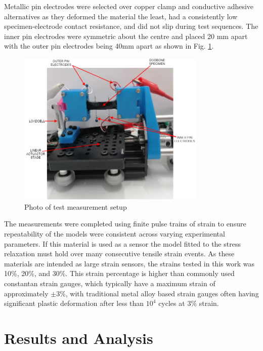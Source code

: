 Metallic pin electrodes were selected over copper clamp and conductive adhesive alternatives as they deformed the material the least, had a consistently low specimen-electrode contact resistance, and did not slip during test sequences. The inner pin electrodes were symmetric about the centre and placed 20 mm apart with the outer pin electrodes being 40mm apart as shown in Fig. \ref{fig:electromech-setup}.
\begin{figure}[H]
	\centering
	\includegraphics[width=9cm]{Figures/ELECTROMECH-SETUP.png}
	\caption{Photo of test measurement setup}
	\label{fig:electromech-setup}
\end{figure}
The measurements were completed using finite pulse trains of strain to ensure repeatability of the models were consistent across varying experimental parameters. If this material is used as a sensor the model fitted to the stress relaxation must hold over many consecutive tensile strain events. As these materials are intended as large strain sensors, the strains tested in this work was 10\%, 20\%, and 30\%. This strain percentage is higher than commonly used constantan strain gauges, which typically have a maximum strain of approximately $\pm 3$\%\cite{VishayPG2018}, with traditional metal alloy based strain gauges often having significant plastic deformation after less than $10^4$ cycles\cite{VishayPG2018} at 3\% strain.



\section{Results and Analysis}

